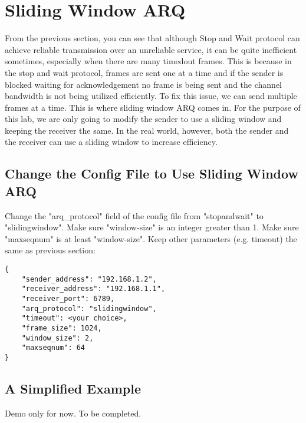 \documentclass[11pt]{article}
\begin{document}
\section{Sliding Window ARQ}
From the previous section, you can see that although Stop and Wait protocol can achieve reliable transmission over an unreliable service, it can be quite inefficient sometimes, especially when there are many timedout frames. This is because in the stop and wait protocol, frames are sent one at a time and if the sender is blocked waiting for acknowledgement no frame is being sent and the channel bandwidth is not being utilized efficiently. To fix this issue, we can send multiple frames at a time. This is where sliding window ARQ comes in. For the purpose of this lab, we are only going to modify the sender to use a sliding window and keeping the receiver the same. In the real world, however, both the sender and the receiver can use a sliding window to increase efficiency.

\subsection{Change the Config File to Use Sliding Window ARQ}
Change the "arq\_protocol" field of the config file from "stopandwait" to "slidingwindow". Make sure "window-size" is an integer greater than 1. Make sure "maxseqnum" is at least "window-size". Keep other parameters (e.g. timeout) the same as previous section:

\begin{lstlisting}[caption={Sliding Window Configuration}]
{
    "sender_address": "192.168.1.2",
    "receiver_address": "192.168.1.1",
    "receiver_port": 6789,
    "arq_protocol": "slidingwindow",
    "timeout": <your choice>,
    "frame_size": 1024,
    "window_size": 2,
    "maxseqnum": 64
}
\end{lstlisting}


\subsection {A Simplified Example}
Demo only for now. To be completed.
\end{document}
